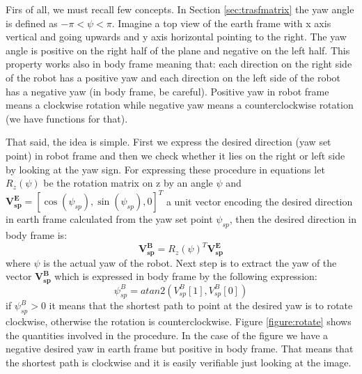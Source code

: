 Firs of all, we must recall few concepts. In Section \ref{sec:trasfmatrix} the yaw angle is defined as $-\pi < \psi < \pi$. Imagine a top view of the earth frame with x axis vertical and going upwards and y axis horizontal pointing to the right. The yaw  angle is positive on the right half of the plane and negative on the left half. This property works also in body frame meaning that: each direction on the right side of the robot has a positive yaw and each direction on the left side of the robot has a negative yaw (in body frame, be careful). Positive yaw in robot frame means a clockwise rotation while negative yaw means a counterclockwise rotation (we have functions for that). 

That said, the idea is simple. First we express the desired direction (yaw set point) in robot frame and then we check whether it lies on the right or left side by looking at the yaw sign. For expressing these procedure in equations let $R_z(\psi)$ be the rotation matrix on z by an angle $\psi$ and $\boldsymbol{V_{sp}^E} = [\cos(\psi_{sp}),\sin(\psi_{sp}),0]^T$ a unit vector encoding the desired direction in earth frame calculated from the yaw set point $\psi_ {sp}$, then the desired direction in body frame is:
\begin{equation}
\boldsymbol{V_{sp}^B} = R_z(\psi) ^T \boldsymbol{V_{sp}^E}
\end{equation}
where $\psi$ is the actual yaw of the robot. Next step is to extract the yaw of the vector $\boldsymbol{V_{sp}^B}$ which is expressed in body frame by the following expression:
\begin{equation}
\psi_{sp} ^ B = atan2(V_{sp}^B[1],V_{sp}^B[0])
\end{equation}
if $\psi_{sp} ^ B > 0$ it means that the shortest path to point at the desired yaw is to rotate clockwise, otherwise the rotation is counterclockwise. Figure \ref{figure:rotate} shows the quantities involved in the procedure. In the case of the figure we have a negative desired yaw in earth frame but positive in body frame. That means that the shortest path is clockwise and it is easily verifiable just looking at the image.

